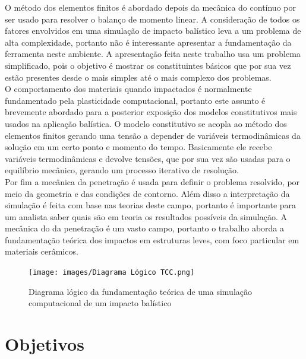 O método dos elementos finitos é abordado depois da mecânica do contínuo por ser usado para resolver o balanço de momento linear. A consideração de todos os fatores envolvidos em uma simulação de impacto balístico leva a um problema de alta complexidade, portanto não é interessante apresentar a fundamentação da ferramenta neste ambiente. A apresentação feita neste trabalho usa um problema simplificado, pois o objetivo é mostrar os constituintes básicos que por sua vez estão presentes desde o mais simples até o mais complexo dos problemas. \\

O comportamento dos materiais quando impactados é normalmente fundamentado pela plasticidade computacional, portanto este assunto é brevemente abordado para a posterior exposição dos modelos constitutivos mais usados na aplicação balística. O modelo constitutivo se acopla ao método dos elementos finitos gerando uma tensão a depender de variáveis termodinâmicas da solução em um certo ponto e momento do tempo. Basicamente ele recebe variáveis termodinâmicas e devolve tensões, que por sua vez são usadas para o equilíbrio mecânico, gerando um processo iterativo de resolução. \\

Por fim a mecânica da penetração é usada para definir o problema resolvido, por meio da geometria e das condições de contorno. Além disso a interpretação da simulação é feita com base nas teorias deste campo, portanto é importante para um analista saber quais são em teoria os resultados possíveis da simulação. A mecânica do da penetração é um vasto campo, portanto o trabalho aborda a fundamentação teórica dos impactos em estruturas leves, com foco particular em materiais cerâmicos. 

\begin{figure}[H]
 	\caption{\label{fig:diagramalog} Diagrama lógico da fundamentação teórica de uma simulação computacional de um impacto balístico}
 	\centering
 	\texttt{[image: images/Diagrama Lógico TCC.png]}
 \end{figure} 
 


\section{Objetivos}

